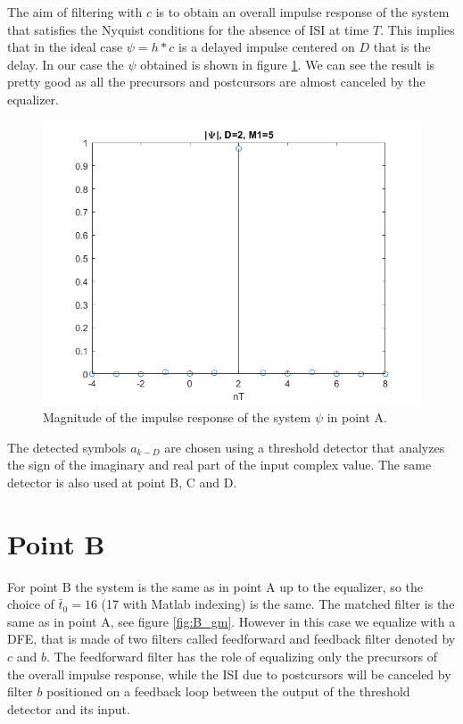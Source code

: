 \documentclass[a4paper,11.5pt]{article}
\begin{document}
The aim of filtering with $c$ is to obtain an overall impulse response of the system that satisfies the Nyquist conditions for the absence of ISI at time $T$. This implies that in the ideal case $\psi=h*c$ is a delayed impulse centered on $D$ that is the delay. In our case the $\psi$ obtained is shown in figure \ref{fig:A_psi}. We can see the result is pretty good as all the precursors and postcursors are almost canceled by the equalizer. 


\begin{figure}[ht]
	\begin{center}   
		\includegraphics[width=\textwidth]{figs/A_psi.png} 
		\caption{Magnitude of the impulse response of the system $\psi$ in point A.}
		\label{fig:A_psi}
	\end{center}
\end{figure}

The detected symbols $a_{k-D}$ are chosen using a threshold detector that analyzes the sign of the imaginary and real part of the input complex value. The same detector is also used at point B, C and D.


\section*{Point B}

For point B the system is the same as in point A up to the equalizer, so the choice of $\bar{t}_0=16$ (17 with Matlab indexing) is the same. The matched filter is the same as in point A, see figure \ref{fig:B_gm}. However in this case we equalize with a DFE, that is made of two filters called feedforward and feedback filter denoted by $c$ and $b$. The feedforward filter has the role of equalizing only the precursors of the overall impulse response, while the ISI due to postcursors will be canceled by filter $b$ positioned on a feedback loop between the output of the threshold detector and its input. 
\end{document}
